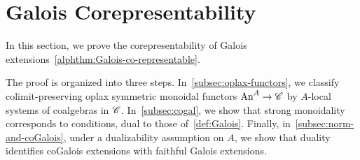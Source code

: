 \documentclass[english,svgnames,table]{article}
\begin{document}


\section{Galois Corepresentability}
\label{sec:corepresentability}
In this section, we prove the corepresentability of Galois extensions~\cref{alphthm:Galois-co-representable}.

The proof is organized into three steps. 
In~\cref{subsec:oplax-functors}, we classify colimit-preserving oplax symmetric monoidal functors $\mathrm{An}^A \to \mathscr{C}$ by $A$-local systems of coalgebras in $\mathscr{C}$.
In~\cref{subsec:cogal}, we show that strong monoidality corresponds to  conditions, dual to those of~\cref{def:Galois}.
Finally, in~\cref{subsec:norm-and-coGalois}, under a dualizability assumption on $A$, we show that duality identifies coGalois extensions with faithful Galois extensions.
\end{document}
